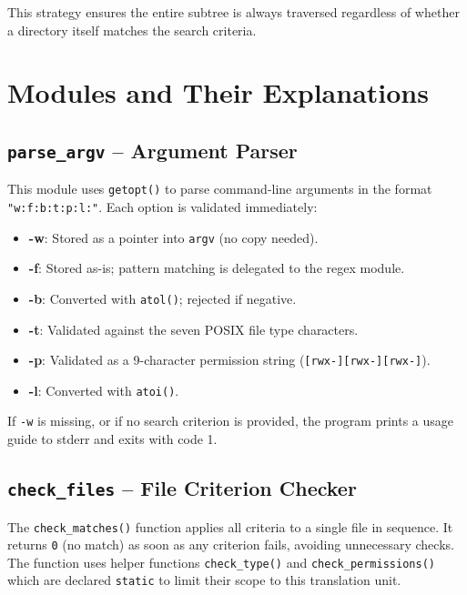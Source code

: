 \documentclass[12pt, a4paper]{article}
\begin{document}
This strategy ensures the entire subtree is always traversed regardless of whether
a directory itself matches the search criteria.

\section{Modules and Their Explanations}

\subsection{\texttt{parse\_argv} -- Argument Parser}

This module uses \texttt{getopt()} to parse command-line arguments in the format
\texttt{"w:f:b:t:p:l:"}. Each option is validated immediately:

\begin{itemize}[noitemsep]
    \item \textbf{-w}: Stored as a pointer into \texttt{argv} (no copy needed).
    \item \textbf{-f}: Stored as-is; pattern matching is delegated to the regex module.
    \item \textbf{-b}: Converted with \texttt{atol()}; rejected if negative.
    \item \textbf{-t}: Validated against the seven POSIX file type characters.
    \item \textbf{-p}: Validated as a 9-character permission string (\texttt{[rwx-][rwx-][rwx-]}).
    \item \textbf{-l}: Converted with \texttt{atoi()}.
\end{itemize}

If \texttt{-w} is missing, or if no search criterion is provided, the program prints a
usage guide to stderr and exits with code 1.

\subsection{\texttt{check\_files} -- File Criterion Checker}

The \texttt{check\_matches()} function applies all criteria to a single file in sequence.
It returns \texttt{0} (no match) as soon as any criterion fails, avoiding unnecessary
checks. The function uses helper functions \texttt{check\_type()} and
\texttt{check\_permissions()} which are declared \texttt{static} to limit their scope
to this translation unit.
\end{document}
